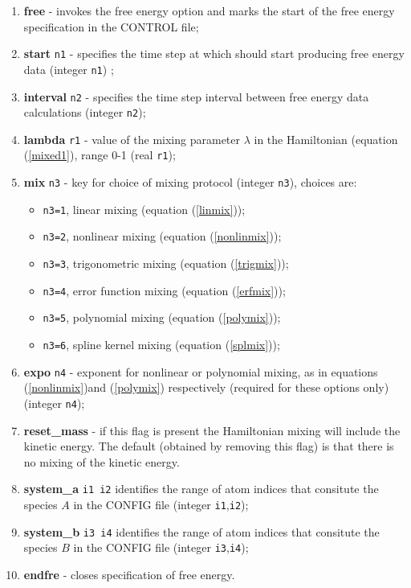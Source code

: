 \begin{enumerate}
\item {\bf free} - invokes the free energy option and marks the start of the free energy
  specification in the CONTROL file;
\item {\bf start} {\tt n1} - specifies the time step at which \D{}
  should start producing free energy data (integer {\tt n1}) ;
\item {\bf interval} {\tt n2} - specifies the time step interval 
  between free energy data calculations (integer {\tt n2});
\item {\bf lambda} {\tt r1} - value of the mixing parameter $\lambda$  in the
  Hamiltonian (equation (\ref{mixed1}), range 0-1 (real {\tt r1});
\item {\bf mix} {\tt n3} - key for choice of mixing protocol (integer {\tt n3}),
  choices are:
\begin{itemize}
\item {\tt n3=1}, linear mixing (equation (\ref{linmix}));
\item {\tt n3=2}, nonlinear mixing (equation (\ref{nonlinmix}));
\item {\tt n3=3}, trigonometric mixing (equation (\ref{trigmix}));
\item {\tt n3=4}, error function mixing (equation (\ref{erfmix}));
\item {\tt n3=5}, polynomial mixing (equation (\ref{polymix}));
\item {\tt n3=6}, spline kernel mixing (equation (\ref{splmix}));
\end{itemize}
\item {\bf expo} {\tt n4} - exponent for nonlinear
   or polynomial mixing, as in equations (\ref{nonlinmix})and (\ref{polymix})
   respectively (required for these options only) (integer {\tt n4});
\item {\bf reset\_mass} - if this flag is present the Hamiltonian mixing will
  include the kinetic energy. The default (obtained by removing this flag) is
  that there is no mixing of the kinetic energy.
\item {\bf system\_a} {\tt i1 i2} identifies the range of atom indices that
   consitute the species $A$ in the CONFIG file (integer {\tt i1},{\tt i2});
\item {\bf system\_b} {\tt i3 i4} identifies the range of atom indices that
   consitute the species $B$ in the CONFIG file (integer {\tt i3},{\tt i4});
\item {\bf endfre} - closes specification of free energy.
\end{enumerate}

